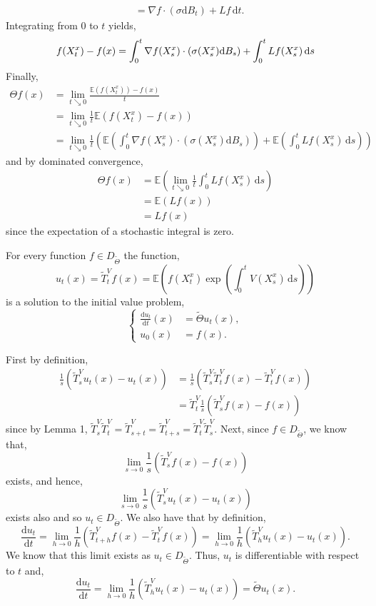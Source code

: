 \documentclass[a4paper,12pt,draft]{report}
\theoremstyle{remark}
\theoremstyle{definition}
\begin{document}
{\begin{align}
& = \nabla f\cdot(\sigma\mathrm{d}B_t) + Lf\,\mathrm{d}t.\nonumber
\end{align}
Integrating from $0$ to $t$ yields,
$$
f(X_t^x) - f(x) = \int_0^t \nabla f(X_s^x)\cdot(\sigma(X_s^x)\mathrm{d}B_s) + \int_0^t Lf(X_s^x)\,\mathrm{d}s\nonumber\\
$$
Finally,
\begin{align}
\Theta f(x) & = \lim_{t \searrow 0}\frac{\mathbb{E}(f(X_t^x)) - f(x)}{t}\nonumber\\
& = \lim_{t \searrow 0}\frac{1}{t}\mathbb{E}(f(X_t^x) - f(x))\nonumber\\
& = \lim_{t \searrow 0}\frac{1}{t}\left(\mathbb{E}\left(\int_0^t \nabla f(X_s^x)\cdot(\sigma(X_s^x)\mathrm{d}B_s)\right) + \mathbb{E}\left(\int_0^t Lf(X_s^x)\,\mathrm{d}s\right)\right)\nonumber
\end{align}
and by dominated convergence,
\begin{align}
\Theta f(x) & = \mathbb{E}\left(\lim_{t \searrow 0}\frac{1}{t}\int_0^t Lf(X_s^x)\,\mathrm{d}s\right)\nonumber\\
& = \mathbb{E}(Lf(x))\nonumber\\
& = Lf(x)\nonumber
\end{align}
since the expectation of a stochastic integral is zero.

\qedhere
}

\lemma
{
For every function $f \in D_{\tilde{\Theta}}$ the function,
$$
u_t(x) = \tilde{T}_t^Vf(x) = \mathbb{E}\left(f(X_t^x)\exp\left(\int_0^t V(X_s^x)\,\mathrm{d}s\right)\right)
$$
is a solution to the initial value problem,
\begin{equation}
\left\{
\begin{aligned}
\frac{\mathrm{d}u_t}{\mathrm{d}t}(x) & = \tilde{\Theta}u_t(x),\\ \label{ACP}
u_0(x) & = f(x).
\end{aligned}
\right.
\end{equation}
}
\proof
{
First by definition,
\begin{align}
\frac{1}{s}(\tilde{T}_s^Vu_t(x) - u_t(x)) & = \frac{1}{s}(\tilde{T}_s^V\tilde{T}_t^Vf(x) - \tilde{T}_t^Vf(x))\nonumber\\
& = \tilde{T}_t^V\frac{1}{s}(\tilde{T}_s^Vf(x) - f(x))\nonumber
\end{align}
since by Lemma 1, $\tilde{T}_s^V\tilde{T}_t^V = \tilde{T}_{s + t}^V = \tilde{T}_{t + s}^V = \tilde{T}_t^V\tilde{T}_s^V$.  Next, since $f \in D_{\tilde{\Theta}}$, we know that,
$$
\lim_{s \to 0}\frac{1}{s}(\tilde{T}_s^Vf(x) - f(x))
$$
exists, and hence,
$$
\lim_{s \to 0}\frac{1}{s}(\tilde{T}_s^Vu_t(x) - u_t(x))
$$
exists also and so $u_t \in D_{\tilde{\Theta}}$.  We also have that by definition,
$$
\frac{\mathrm{d}u_t}{\mathrm{d} t} = \lim_{h \to 0}\frac{1}{h}(\tilde{T}_{t + h}^Vf(x) - \tilde{T}_t^Vf(x)) = \lim_{h \to 0}\frac{1}{h}(\tilde{T}_h^Vu_t(x) - u_t(x)).
$$
We know that this limit exists as $u_t \in D_{\tilde{\Theta}}$.  Thus, $u_t$ is differentiable with respect to $t$ and,
$$
\frac{\mathrm{d}u_t}{\mathrm{d} t} = \lim_{h \to 0}\frac{1}{h}(\tilde{T}_h^Vu_t(x) - u_t(x)) = \tilde{\Theta}u_t(x).
$$

\qedhere
}
\end{document}
